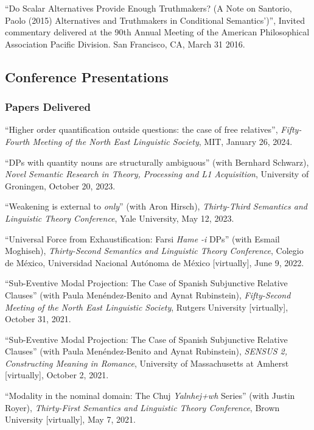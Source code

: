 \documentclass[11pt]{article}
\begin{document}
``Do Scalar Alternatives Provide Enough Truthmakers? (A Note on Santorio, Paolo (2015) Alternatives and Truthmakers in Conditional Semantics')'', Invited commentary delivered at the 90th Annual Meeting of the American Philosophical Association Pacific Division. San Francisco, CA, March 31 2016. 


\subsection*{Conference Presentations}


\subsubsection*{Papers Delivered}

``Higher order quantification outside questions: the case of free relatives'', \textit{Fifty-Fourth
  Meeting of the North East Linguistic Society}, MIT, January 26, 2024.

``DPs with quantity nouns are structurally ambiguous'' (with Bernhard Schwarz), \textit{Novel Semantic Research in Theory, Processing and L1 Acquisition}, University of Groningen, October 20, 2023.

``Weakening is external to \textit{only}'' (with Aron Hirsch), \textit{Thirty-Third Semantics and Linguistic Theory Conference}, Yale University, May 12, 2023.

``Universal Force from Exhaustification:
Farsi \textit{Hame} \textit{-i} DPs'' (with Esmail Moghiseh), \textit{Thirty-Second Semantics and Linguistic Theory Conference}, Colegio de M\'exico, Universidad Nacional Aut\'onoma de M\'exico [virtually], June 9, 2022.

``Sub-Eventive Modal Projection:
The Case of Spanish Subjunctive Relative Clauses'' (with Paula Men\'endez-Benito and Aynat Rubinstein), \textit{Fifty-Second Meeting of the North East Linguistic Society}, Rutgers University [virtually], October 31, 2021.


``Sub-Eventive Modal Projection:
The Case of Spanish Subjunctive Relative Clauses'' (with Paula Men\'endez-Benito and Aynat Rubinstein), \textit{SENSUS 2, Constructing Meaning in Romance}, University of Massachusetts at Amherst [virtually], October 2, 2021.

``Modality in the nominal domain: The Chuj \textit{Yalnhej+wh} Series'' (with Justin Royer), \textit{Thirty-First Semantics and Linguistic Theory Conference}, Brown University [virtually], May 7, 2021.
\end{document}
